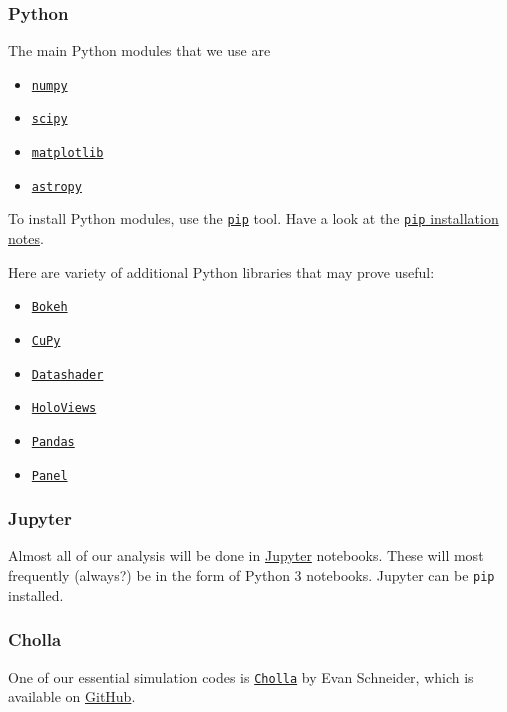 \subsubsection{Python}
\label{sec:python}

The main Python modules that we use are
\begin{itemize}
	\item \href{https://numpy.org}{\tt numpy}
	\item \href{https://www.scipy.org}{\tt scipy}
	\item \href{https://matplotlib.org}{\tt matplotlib}
	\item \href{https://www.astropy.org}{\tt astropy}
\end{itemize}

\noindent
To install Python modules, use the \href{https://pypi.org/project/pip/}{\tt pip} tool. Have a look at the \href{https://pip.pypa.io/en/stable/installing/}{{\tt pip} installation notes}.


Here are variety of additional Python libraries that may prove useful:
\begin{itemize}
	\item \href{https://bokeh.org/}{\tt Bokeh}
	\item \href{https://cupy.dev/}{\tt CuPy}
	\item \href{https://datashader.org/}{\tt Datashader}
	\item \href{https://holoviews.org/}{\tt HoloViews}
	\item \href{https://pandas.pydata.org/}{\tt Pandas}	
	\item \href{https://panel.holoviz.org/}{\tt Panel}	
\end{itemize}

\subsubsection{Jupyter}
\label{sec:jupyter}

Almost all of our analysis will be done in \href{https://jupyter.org/}{Jupyter} notebooks. These will most frequently (always?) be in the form of Python 3 notebooks. Jupyter can be {\tt pip} installed.

\subsubsection{Cholla}
\label{sec:cholla}

One of our essential simulation codes is \href{https://github.com/cholla-hydro/cholla}{{\tt Cholla}} by Evan Schneider, which is available on \href{https://github.com}{GitHub}.

